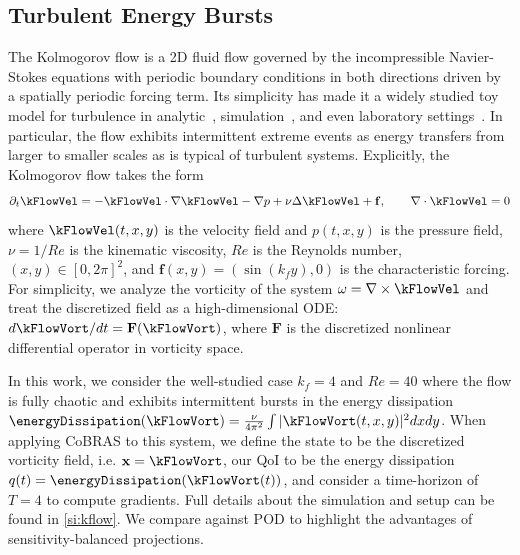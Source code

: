 \documentclass[twocolumn,10pt]{article}
\begin{document}
\subsection{Turbulent Energy Bursts}
The Kolmogorov flow is a 2D fluid flow governed by the incompressible Navier-Stokes equations with periodic boundary conditions in both directions driven by a spatially periodic forcing term. 
Its simplicity has made it a widely studied toy model for turbulence in analytic~\cite{platt1991investigation}, simulation~\cite{borue1996numerical,qin2025clean}, and even laboratory settings~\cite{obukhov1983kolmogorov}. In particular, the flow exhibits intermittent extreme events as energy transfers from larger to smaller scales as is typical of turbulent systems.
Explicitly, the Kolmogorov flow takes the form
$$\partial_t \kFlowVel = - \kFlowVel \cdot \nabla \kFlowVel - \nabla p + \nu \Delta \kFlowVel + \mathbf f 
,\qquad \nabla \cdot \kFlowVel = 0$$ 
where $\kFlowVel(t, x,y)$ is the velocity field and $p(t, x, y)$ is the pressure field, $\nu = 1/Re$ is the kinematic viscosity, $Re$ is the Reynolds number, $(x,y) \in [0,2\pi]^2$,  and $\mathbf f(x,y) = (\sin(k_f y),0)$ is the 
characteristic forcing. For simplicity, we analyze the vorticity of the system $\omega = \nabla \times \kFlowVel$ and treat the discretized field as a high-dimensional ODE: 
$d\kFlowVort/dt = \mathbf F(\kFlowVort)$, where $\mathbf F$ is the discretized nonlinear differential operator in vorticity space. 

In this work, we consider the well-studied case $k_f = 4$ and $Re=40$ where the flow is fully chaotic and exhibits intermittent bursts in the energy dissipation $\energyDissipation(\kFlowVort) = \frac{\nu}{4\pi^2} \int |\kFlowVort(t, x,y)|^2 dxdy$. 
When applying CoBRAS to this system, we define the state to be the discretized vorticity field, i.e. $\mathbf x = \kFlowVort$, our QoI to be the energy dissipation  
 $q(t) = \energyDissipation(\kFlowVort(t))$, and consider a time-horizon of $T=4$ to compute gradients. Full details about the simulation and setup can be found in \ref{si:kflow}. We compare against POD to highlight the advantages of sensitivity-balanced projections.
\end{document}
